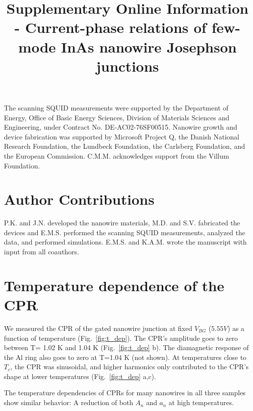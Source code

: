\documentclass[11pt]{article}
\begin{document}
The scanning SQUID measurements were supported by the Department of Energy, Office of Basic Energy Sciences, Division of Materials Sciences and Engineering, under Contract No. DE-AC02-76SF00515. Nanowire growth and device fabrication was supported  by  Microsoft  Project  Q, the Danish National Research Foundation, the Lundbeck Foundation,  the  Carlsberg Foundation, and the European Commission. C.M.M. acknowledges support from the
Villum Foundation.

\section{Author Contributions}
P.K. and J.N. developed the nanowire materials, M.D. and S.V. fabricated the devices and E.M.S. performed the scanning SQUID measurements, analyzed the data, and performed simulations. E.M.S. and K.A.M. wrote the manuscript with input from all coauthors.


\renewcommand{\thefigure}{S\arabic{figure}}
\renewcommand{\theequation}{S.\arabic{equation}}
\renewcommand{\bibnumfmt}[1]{[S#1]}
\renewcommand{\citenumfont}[1]{S#1}
\renewcommand{\thesection}{S\arabic{section}}

\title{Supplementary Online Information - Current-phase relations of few-mode InAs nanowire Josephson junctions}

\maketitle

\setcounter{section}{0}
\setcounter{figure}{0}

\section{Temperature dependence of the CPR}

We measured the CPR of the gated nanowire junction at fixed $V_{BG}$ ($5.55 V$) as a function of temperature (Fig.~\ref{fig:t_dep}). The CPR's amplitude goes to zero between T= 1.02 K and 1.04 K (Fig.~\ref{fig:t_dep} b). The diamagnetic response of the Al ring also goes to zero at T=1.04 K (not shown). At temperatures close to $T_c$, the CPR was sinusoidal, and higher harmonics only contributed to the CPR's shape at lower temperatures (Fig.~\ref{fig:t_dep} a,c). 

The temperature dependencies of CPRs for many nanowires in all three samples show similar behavior: A reduction of both $A_n$ and $a_n$ at high temperatures.
\end{document}
